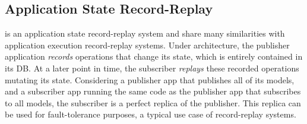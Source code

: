 \subsection{Application State Record-Replay}
\label{synapse:s:record-replay}

\begin{table}[t]
 \caption{{\bf Similarities between \scribe and \synapse }
 Each row depicts the equivalent entity with \scribe and \synapse.}
 \label{synapse:tab:similarities}
\end{table}

\synapse is an application state record-replay system and share many
similarities with application execution record-replay systems.
Under \synapse architecture, the publisher application {\em records} operations that
change its state, which is entirely contained in its DB.  At a later
point in time, the subscriber {\em replays} these recorded operations mutating
its state. Considering a publisher app that publishes all of its models, and a
subscriber app running the same code as the publisher app that subscribes to all
models, the subscriber is a perfect replica of the publisher. This replica
can be used for fault-tolerance purposes, a typical use case of record-replay systems.

